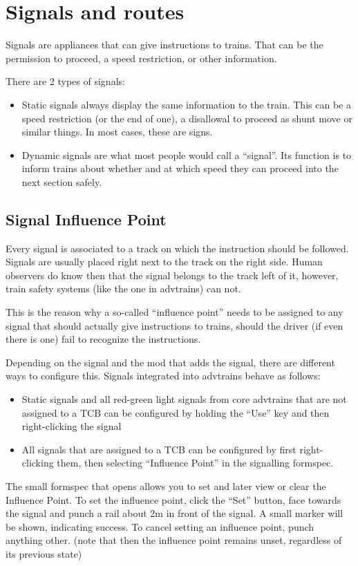 \documentclass[english]{paper}
\begin{document}
\section{Signals and routes}

Signals are appliances that can give instructions to trains. That
can be the permission to proceed, a speed restriction, or other information.

There are 2 types of signals:
\begin{itemize}
\item Static signals always display the same information to the train. This
can be a speed restriction (or the end of one), a disallowal to proceed
as shunt move or similar things. In most cases, these are signs.
\item Dynamic signals are what most people would call a ``signal''. Its
function is to inform trains about whether and at which speed they
can proceed into the next section safely.
\end{itemize}

\subsection{Signal Influence Point}

Every signal is associated to a track on which the instruction should
be followed. Signals are usually placed right next to the track on
the right side. Human observers do know then that the signal belongs
to the track left of it, however, train safety systems (like the one
in advtrains) can not.

This is the reason why a so-called ``influence point'' needs to
be assigned to any signal that should actually give instructions to
trains, should the driver (if even there is one) fail to recognize
the instructions.

Depending on the signal and the mod that adds the signal, there are
different ways to configure this. Signals integrated into advtrains
behave as follows:
\begin{itemize}
\item Static signals and all red-green light signals from core advtrains
that are not assigned to a TCB can be configured by holding the ``Use''
key and then right-clicking the signal
\item All signals that are assigned to a TCB can be configured by first
right-clicking them, then selecting ``Influence Point'' in the signalling
formspec.
\end{itemize}
The small formspec that opens allows you to set and later view or
clear the Influence Point. To set the influence point, click the ``Set''
button, face towards the signal and punch a rail about 2m in front
of the signal. A small marker will be shown, indicating success. To
cancel setting an influence point, punch anything other. (note that
then the influence point remains unset, regardless of its previous
state)
\end{document}
